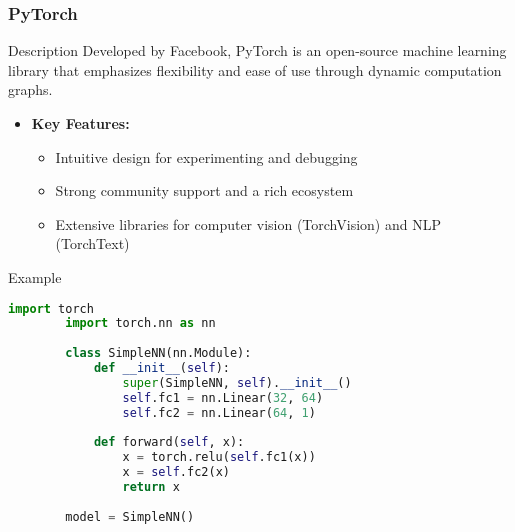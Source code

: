 \documentclass[aspectratio=169]{beamer}
\begin{document}
\begin{frame}[fragile]
    \frametitle{PyTorch}
    \begin{block}{Description}
        Developed by Facebook, PyTorch is an open-source machine learning library that emphasizes flexibility and ease of use through dynamic computation graphs.
    \end{block}
    \begin{itemize}
        \item \textbf{Key Features:}
            \begin{itemize}
                \item Intuitive design for experimenting and debugging
                \item Strong community support and a rich ecosystem
                \item Extensive libraries for computer vision (TorchVision) and NLP (TorchText)
            \end{itemize}
    \end{itemize}
    \begin{block}{Example}
        \begin{lstlisting}[language=Python]
        import torch
        import torch.nn as nn
        
        class SimpleNN(nn.Module):
            def __init__(self):
                super(SimpleNN, self).__init__()
                self.fc1 = nn.Linear(32, 64)
                self.fc2 = nn.Linear(64, 1)
        
            def forward(self, x):
                x = torch.relu(self.fc1(x))
                x = self.fc2(x)
                return x
        
        model = SimpleNN()
        \end{lstlisting}
    \end{block}
\end{frame}
\end{document}
